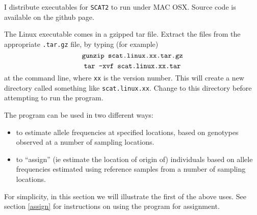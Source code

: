 \documentclass[11pt,titlepage,times,letterpaper]{article}
\def\SCAT{{\tt SCAT2} }
\begin{document}
I distribute executables for \SCAT to run under MAC OSX.
Source code is available on the github page. 

The Linux executable comes in a gzipped tar file.
Extract the files from the appropriate {\tt .tar.gz} file, by typing
(for example)
$$\text{{\tt gunzip scat.linux.xx.tar.gz}}$$
$$\text{{\tt tar -xvf scat.linux.xx.tar}}$$
at the command line, where {\tt xx} is the version number.
This will create a new directory called something like
{\tt scat.linux.xx}. Change to this directory before
attempting to run the program.

%
%

%

The program can be used in two different ways:
\begin{itemize}
\item to estimate allele frequencies at specified
locations, based on genotypes observed at a number of sampling
locations.
\item to ``assign'' (ie estimate the location of origin of)
individuals based on allele
frequencies estimated using reference samples from a number of
sampling locations.
\end{itemize}

For simplicity, in this section we will illustrate the first
of the above uses. See section \ref{assign} for
instructions on using the program for assignment.
\end{document}
